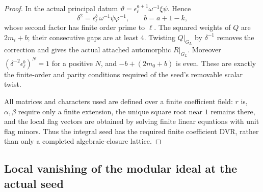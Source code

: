 \begin{proof}
In the actual principal datum
\(\vartheta=\epsilon_\ell^{a+1}\omega^{-1}\xi\psi\).
Hence
\[
 \delta^2=\epsilon_\ell^{b}\,\omega^{-1}\psi\varphi^{-1},
 \qquad b=a+1-k,
\]
whose second factor has finite order prime to \(\ell\).
The squared weights of \(Q\) are \(2m_i+b\);
their consecutive gaps are at least \(4\).
Twisting \(Q|_{G_L}\) by \(\delta^{-1}\) removes the correction
and gives the actual attached automorphic \(R|_{G_L}\).
Moreover
\((\delta^{-2}\epsilon_\ell^b)^N=1\) for a positive \(N\),
and \(-b+(2m_0+b)\) is even.
These are exactly the finite-order and parity conditions
required of the seed's removable scalar twist.

All matrices and characters used are defined over a finite
coefficient field: \(r\) is, \(\alpha,\beta\) require only a
finite extension, the unique square root near \(1\) remains
there, and the local flag vectors are obtained by solving
finite linear equations with unit flag minors.
Thus the integral seed has the required finite coefficient
DVR, rather than only a completed algebraic-closure lattice.
\end{proof}


\subsection{Local vanishing of the modular ideal at the actual seed}
\label{subsec:sr-seed-local-zero}

